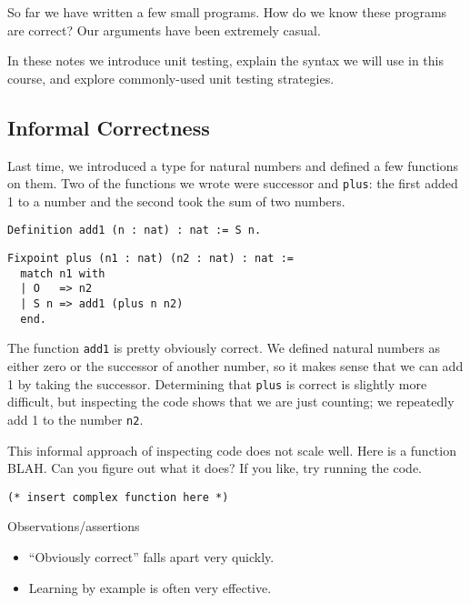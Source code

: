 \documentclass{article}
\begin{document}
\maketitle
So far we have written a few small programs.
How do we know these programs are correct?
Our arguments have been extremely casual.

In these notes we introduce unit testing, explain the syntax we will use in this course, and explore commonly-used unit testing strategies.

\subsection*{Informal Correctness}
Last time, we introduced a type for natural numbers and defined a few functions on them.
Two of the functions we wrote were successor and \texttt{plus}: the first added 1 to a number and the second took the sum of two numbers.
\begin{verbatim}
Definition add1 (n : nat) : nat := S n.
\end{verbatim}
\begin{verbatim}
Fixpoint plus (n1 : nat) (n2 : nat) : nat :=
  match n1 with
  | O   => n2
  | S n => add1 (plus n n2)
  end.
\end{verbatim}
The function \texttt{add1} is pretty obviously correct.
We defined natural numbers as either zero or the successor of another number, so it makes sense that we can add 1 by taking the successor.
Determining that \texttt{plus} is correct is slightly more difficult, but inspecting the code shows that we are just counting; we repeatedly add 1 to the number \texttt{n2}.

This informal approach of inspecting code does not scale well.
Here is a function BLAH.
Can you figure out what it does?
If you like, try running the code.
\begin{verbatim}
(* insert complex function here *)
\end{verbatim}


Observations/assertions
\begin{itemize}
\item
  ``Obviously correct'' falls apart very quickly.
\item
  Learning by example is often very effective.
\end{itemize}
\end{document}
